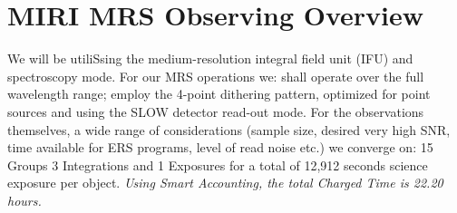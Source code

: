 \section*{MIRI MRS Observing Overview}
We will be utiliSsing the medium-resolution integral field unit (IFU) and spectroscopy mode.  
For our MRS operations we: shall operate over the full wavelength range; 
employ the 4-point dithering pattern, optimized for point sources and using the SLOW  detector read-out mode. For the observations themselves, a wide range of considerations (sample size, desired very high SNR, time available for ERS programs, level of read noise etc.) we converge on:
15 Groups
3 Integrations and 
1 Exposures for a total 
of 12,912 seconds science exposure per object.
{\it Using Smart Accounting, the total Charged Time is 22.20 hours.}


